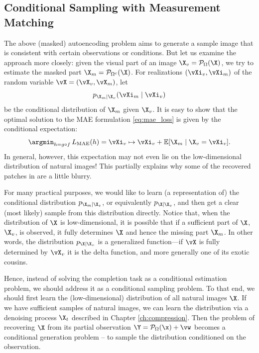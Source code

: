 \documentclass[../../book-main.tex]{subfiles}
\begin{document}
\subsection{Conditional Sampling with Measurement Matching}
\label{sec:conditioned-decoding}
The above (masked) autoencoding problem aims to generate a sample image that is consistent with certain observations or conditions. But let us examine the approach more closely: given the
visual part of an image $\X_v = \mathcal{P}_{\Omega}(\X)$, we try to
estimate the masked part $\X_m = \mathcal{P}_{\Omega^c}(\X)$. For realizations
$(\vXi_v, \vXi_m)$ of the random variable $\vX=(\vX_v, \vX_m)$, let
\[p_{\X_m \mid \X_v}(\vXi_m\mid \vXi_v)\]
be the conditional distribution of $\X_m$ given
$\X_v$. It is easy to show that the optimal solution to the  MAE
formulation \eqref{eq:mae_loss} is given by the conditional expectation:
\begin{equation}
  \argmin_{h = g \circ f}\, L_{\mathrm{MAE}}(h)
  = \vXi_v \mapsto \vXi_v + \mathbb{E}[\X_m \mid \X_v=\vXi_v].
\end{equation}
In general, however, this expectation may not even lie on the
low-dimensional distribution of natural images! This partially
explains why some of the recovered patches in 
are a little blurry.

For many practical purposes, we would like to learn (a representation
of) the conditional distribution $p_{\X_m \mid \X_v}$, or equivalently
$p_{\X \mid \X_v}$,
and then get a clear (most likely) sample from this distribution directly. Notice that, when the distribution of $\X$ is low-dimensional, it is possible that if a
sufficient part of $\X$, $\X_v$, is observed, it fully determines
$\X$ and hence the missing part $\X_m$. In other words, the distribution
$p_{\X \mid \X_v}$ is a generalized function---if $\vX$ is fully determined by $\vX_v$ it is the delta function, and more generally one of its exotic cousins.

Hence, instead of solving the completion task as a conditional estimation problem, we should address it as a conditional sampling problem. To that end, we should first learn the (low-dimensional) distribution of all natural images $\X$. If we have sufficient samples of natural images, we can learn the distribution via a denoising process $\X_t$ described in Chapter \ref{ch:compression}. Then the problem of recovering $\X$ from its partial observation $\Y = \mathcal{P}_\Omega(\x) +\vw$ becomes a conditional generation problem -- to sample the distribution conditioned on the observation.
\end{document}
